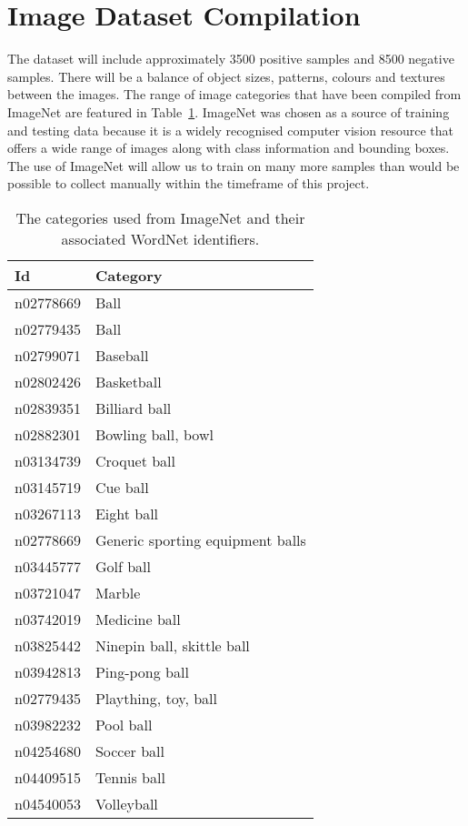 \documentclass{llncs}
\begin{document}
	\section{Image Dataset Compilation} {
	\label{sec:dataset}

		The dataset will include approximately 3500 positive samples and 8500 negative samples. There will be a balance of object sizes, patterns, colours and textures between the images. The range of image categories that have been compiled from ImageNet are featured in Table~\ref{tab:imagenet}. ImageNet was chosen as a
		source of training and testing data because it is a widely recognised computer vision resource that offers a wide range of images along with class information and bounding boxes. The use of ImageNet will allow us to train on many more samples than would be possible to collect manually within the timeframe of this project.

		\begin{table}
			\centering
			\caption{The categories used from ImageNet and their associated WordNet \citep{fellbaum1998wordnet} identifiers.}
			\label{tab:imagenet}
			\begin{tabularx}{\textwidth}{lX}
				\toprule
				\textbf{Id} & \textbf{Category} \\
				\midrule
					n02778669 & Ball \\
					n02779435 & Ball \\
					n02799071 & Baseball \\
					n02802426 & Basketball \\
					n02839351 & Billiard ball \\
					n02882301 & Bowling ball, bowl \\
					n03134739 & Croquet ball \\
					n03145719 & Cue ball \\
					n03267113 & Eight ball \\
					n02778669 & Generic sporting equipment balls \\
					n03445777 & Golf ball \\
					n03721047 & Marble \\
					n03742019 & Medicine ball \\
					n03825442 & Ninepin ball, skittle ball \\
					n03942813 & Ping-pong ball \\
					n02779435 & Plaything, toy, ball \\
					n03982232 & Pool ball \\
					n04254680 & Soccer ball \\
					n04409515 & Tennis ball \\
					n04540053 & Volleyball \\
				\bottomrule
			\end{tabularx}
		\end{table}

}
\end{document}

